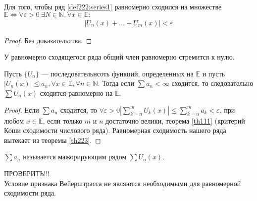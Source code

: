 \begin{theorem}
  \label{th223}
  Для того, чтобы ряд \ref{def222:series1} равномерно сходился на множестве
  $\mathbb{E} \Longleftrightarrow \forall \varepsilon > 0 \ \exists N \in \mathbb{N},
  \forall x \in \mathbb{E}: $
  \begin{gather}
    |U_n(x) + \dots + U_m(x)| < \varepsilon \label{th223:uneq1}
  \end{gather}
\end{theorem}

\begin{proof}
  Без доказательства.
\end{proof}

\begin{consequence}
  У равномерно сходящегося ряда общий член равномерно стремится к нулю.
\end{consequence}

\begin{theorem}
  Пусть $\{U_n\}$ --- последовательнсоть функций, определенных на $\mathbb{E}$
  и пусть $|U_n(x)| \leq a_n, \forall x \in \mathbb{E}, \forall n \in \mathbb{N}.$
  Тогда если $\sum a_n < \infty$ сходится, то следовательно $\sum U_n(x)$ сходится
  равномерно на $\mathbb{E}$.
\end{theorem}
\begin{proof}
  Если $\sum a_n$ сходится, то $\forall \varepsilon > 0 |
  \sum\limits_{k = n}^{m} U_k(x)| \leq
  \sum\limits_{k = n}^{m} a_k < \varepsilon$, при любом $x \in \mathbb{E}$,
  если только $m$ и $n$ достаточно велики, теорема \ref{th111} (критерий Коши
  сходимости числового ряда). Равномерная сходимость нашего ряда вытекает из
  теоремы \ref{th223}.
\end{proof}
\begin{remark}
  $\sum a_n$ называется мажорирующим рядом $\sum U_n(x)$.
\end{remark}

\begin{remark}
  ПРОВЕРИТЬ!!! \\
  Условие признака Вейерштрасса не являются необходимыми для равномерной
  сходимости ряда.
\end{remark}

